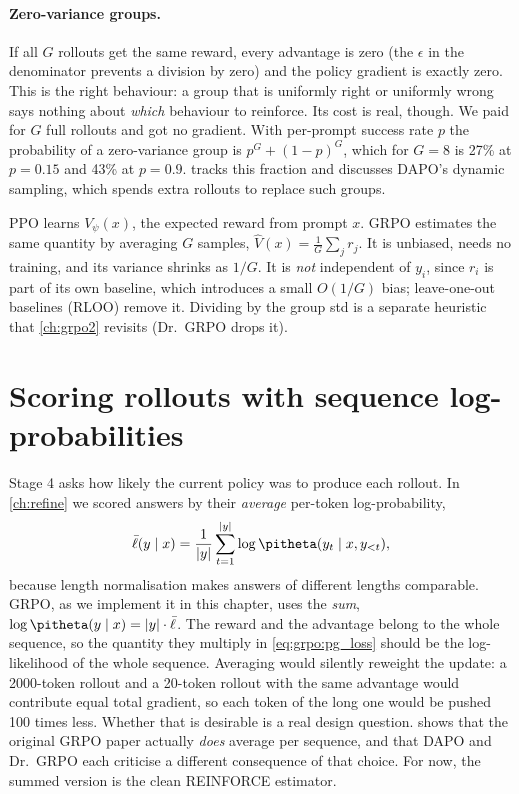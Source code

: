 \paragraph{Zero-variance groups.} If all $G$ rollouts get the same reward, every advantage
is zero (the $\epsilon$ in the denominator prevents a division by zero) and the policy
gradient is exactly zero. This is the right behaviour: a group that is uniformly right or
uniformly wrong says nothing about \emph{which} behaviour to reinforce. Its cost is real,
though. We paid for $G$ full rollouts and got no gradient. With per-prompt success rate $p$
the probability of a zero-variance group is $p^G+(1-p)^G$, which for $G=8$ is 27\% at
$p=0.15$ and 43\% at $p=0.9$.  tracks this fraction and discusses DAPO's
dynamic sampling, which spends extra rollouts to replace such groups.

\begin{keyidea}
PPO learns $V_\psi(x)$, the expected reward from prompt $x$. GRPO estimates the same
quantity by averaging $G$ samples, $\hat V(x)=\frac1G\sum_j r_j$. It is unbiased, needs no
training, and its variance shrinks as $1/G$. It is \emph{not} independent of $y_i$, since
$r_i$ is part of its own baseline, which introduces a small $O(1/G)$ bias; leave-one-out
baselines (RLOO) remove it. Dividing by the group std is a separate heuristic that
\cref{ch:grpo2} revisits (Dr.~GRPO drops it).
\end{keyidea}

\section{Scoring rollouts with sequence log-probabilities}\label{sec:grpo:logprobs}

Stage 4 asks how likely the current policy was to produce each rollout. In
\cref{ch:refine} we scored answers by their \emph{average} per-token log-probability,
\begin{equation}
\bar\ell(y\mid x)=\frac1{|y|}\sum_{t=1}^{|y|}\log\pitheta(y_t\mid x,y_{<t}),
\end{equation}
because length normalisation makes answers of different lengths comparable. GRPO, as we
implement it in this chapter, uses the \emph{sum}, $\log\pitheta(y\mid x)=|y|\cdot\bar\ell$.
The reward and the advantage belong to the whole sequence, so the quantity they multiply in
\cref{eq:grpo:pg_loss} should be the log-likelihood of the whole sequence. Averaging would
silently reweight the update: a 2000-token rollout and a 20-token rollout with the same
advantage would contribute equal total gradient, so each token of the long one would be
pushed 100 times less. Whether that is desirable is a real design question.
 shows that the original GRPO paper actually \emph{does} average per sequence,
and that DAPO and Dr.~GRPO each criticise a different consequence of that choice. For now,
the summed version is the clean REINFORCE estimator.

